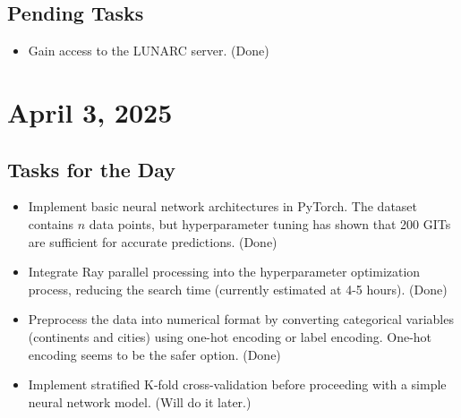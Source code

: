 \documentclass{article}
\begin{document}
\subsection*{Pending Tasks}
\begin{itemize}
    \item Gain access to the LUNARC server. (Done)
\end{itemize}

\section{April 3, 2025}

\subsection*{Tasks for the Day}
\begin{itemize}
    \item Implement basic neural network architectures in PyTorch. The dataset contains \( n \) data points, but hyperparameter tuning has shown that 200 GITs are sufficient for accurate predictions. (Done)
    \item Integrate Ray parallel processing into the hyperparameter optimization process, reducing the search time (currently estimated at 4-5 hours). (Done)
    \item Preprocess the data into numerical format by converting categorical variables (continents and cities) using one-hot encoding or label encoding. One-hot encoding seems to be the safer option. (Done)
    \item Implement stratified K-fold cross-validation before proceeding with a simple neural network model. (Will do it later.)
\end{itemize}
\end{document}
